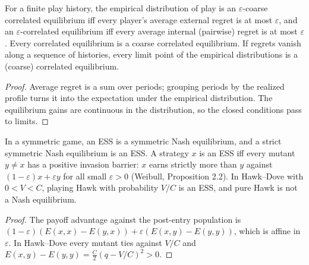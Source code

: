 \begin{theorem}
\label{thm:beh-noregret}
\leanok
For a finite play history, the empirical distribution of play is an $\varepsilon$-coarse correlated equilibrium iff
every player's average external regret is at most $\varepsilon$, and an $\varepsilon$-correlated equilibrium iff every
average internal (pairwise) regret is at most $\varepsilon$. Every correlated equilibrium is a coarse correlated
equilibrium. If regrets vanish along a sequence of histories, every limit point of the empirical distributions is a
(coarse) correlated equilibrium.
\end{theorem}
\begin{proof}
\leanok
Average regret is a sum over periods; grouping periods by the realized profile turns it into the expectation under
the empirical distribution. The equilibrium gains are continuous in the distribution, so the closed conditions
pass to limits.
\end{proof}

\begin{theorem}
\label{thm:beh-ess}
\leanok
In a symmetric game, an ESS is a symmetric Nash equilibrium, and a strict symmetric Nash equilibrium is an ESS.
A strategy $x$ is an ESS iff every mutant $y\ne x$ has a positive invasion barrier: $x$ earns strictly more than $y$
against $(1-\varepsilon)x+\varepsilon y$ for all small $\varepsilon>0$ (Weibull, Proposition 2.2). In Hawk--Dove with
$0<V<C$, playing Hawk with probability $V/C$ is an ESS, and pure Hawk is not a Nash equilibrium.
\end{theorem}
\begin{proof}
\leanok
The payoff advantage against the post-entry population is $(1-\varepsilon)(E(x,x)-E(y,x))+\varepsilon(E(x,y)-E(y,y))$,
which is affine in $\varepsilon$. In Hawk--Dove every mutant ties against $V/C$ and
$E(x,y)-E(y,y)=\tfrac{C}{2}(q-V/C)^2>0$.
\end{proof}

